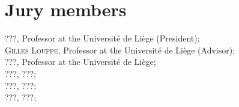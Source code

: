 
\chapter*{Jury members}


\noindent \textsc{???}, Professor at the Universit{\'e} de Li{\`e}ge (President); \\

\noindent \textsc{Gilles Louppe}, Professor at the Universit{\'e} de Li{\`e}ge (Advisor); \\

\noindent \textsc{???}, Professor at the Universit{\'e} de Li{\`e}ge; \\

\noindent \textsc{???}, ???; \\

\noindent \textsc{???}, ???; \\

\noindent \textsc{???}, ???; \\
